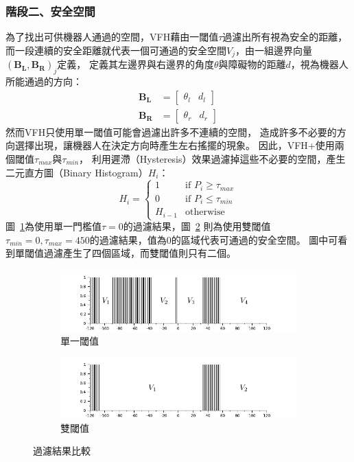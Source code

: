 \subsubsection{階段二、安全空間}
為了找出可供機器人通過的空間，VFH藉由一閾值$\tau$過濾出所有視為安全的距離，
而一段連續的安全距離就代表一個可通過的安全空間$V_j$，由一組邊界向量$(\mathbf{B_L},\mathbf{B_R})_j$定義，
定義其左邊界與右邊界的角度$\theta$與障礙物的距離$d$，視為機器人所能通過的方向：
\begin{align}
	\mathbf{B_L}	&= \begin{bmatrix}
				\theta_l & d_l
			   \end{bmatrix} \nonumber \\
	\mathbf{B_R}	&= \begin{bmatrix}
				\theta_r & d_r
			   \end{bmatrix}
	\label{e:boundary}
\end{align}
然而VFH只使用單一閾值可能會過濾出許多不連續的空間，
造成許多不必要的方向選擇出現，讓機器人在決定方向時產生左右搖擺的現象。
因此，VFH+使用兩個閾值$\tau_{max}$與$\tau_{min}$，
利用遲滯（Hysteresis）效果過濾掉這些不必要的空間，產生二元直方圖（Binary Histogram）$H_i$：
\begin{equation}
	H_i = 
	\begin{cases}
		1	& \textrm{if } P_i \geq \tau_{max} \\
		0	& \textrm{if } P_i \leq \tau_{min} \\
		H_{i-1}	& \textrm{otherwise}
	\end{cases}
\end{equation}
圖~\ref{f:binary_histogram_1}為使用單一門檻值$\tau=0$的過濾結果，圖~\ref{f:binary_histogram_2}
則為使用雙閾值$\tau_{min}=0,\tau_{max}=450$的過濾結果，值為$0$的區域代表可通過的安全空間。
圖中可看到單閾值過濾產生了四個區域，而雙閾值則只有二個。
\begin{figure}[h!]
	\centering
	\begin{subfigure}[b]{0.8\textwidth}
		\includegraphics[width=\textwidth]{figures/algorithm/binary_histogram_1}
		\caption{單一閾值}
		\label{f:binary_histogram_1}
	\end{subfigure}
	\begin{subfigure}[b]{0.8\textwidth}
		\includegraphics[width=\textwidth]{figures/algorithm/binary_histogram_2}
		\caption{雙閾值}
		\label{f:binary_histogram_2}
	\end{subfigure}
	\caption{過濾結果比較}
	\label{f:binary_histogram}
\end{figure}

